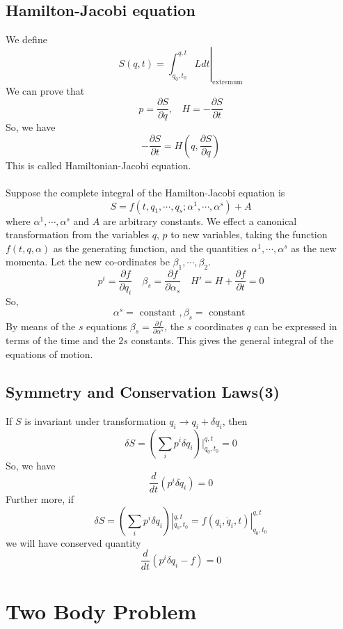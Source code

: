 \section{Hamilton-Jacobi equation}
We define
\[S(q,t)=\left. \int_{q_0,t_0}^{q,t} L dt\right|_{\mathrm{extremum}}\]
We can prove that
\[p = \frac{\partial S}{\partial q}, \ \ \ \ H = -\frac{\partial S}{\partial t}\]
So, we have
\[-\frac{\partial S}{\partial t} = H (q,\frac{\partial S}{\partial q})\]
This is called Hamiltonian-Jacobi equation.\\ \\
Suppose the complete integral of the Hamilton-Jacobi equation is
\[S=f(t,q_1,\cdots,q_s;\alpha^1,\cdots,\alpha^s)+A\]
where $\alpha^1,\cdots,\alpha^s$ and $A$ are arbitrary constants. We effect a canonical transformation from the
variables $q$, $p$ to new variables, taking the function $f(t,q,\alpha)$ as the generating function, and the quantities $\alpha^1,\cdots,\alpha^s$ as the new momenta.
Let the new co-ordinates be $\beta_1,\cdots,\beta_2$.
\[p^i = \frac{\partial f}{\partial q_i} \quad \beta_s = \frac{\partial f}{\partial \alpha_s} \quad H' = H + \frac{\partial f}{\partial t} =0\]
So,
\[\alpha^s = \mbox{ constant }, \beta_s = \mbox{ constant }\]
By means of the $s$ equations $\beta_s = \frac{\partial f}{\partial \alpha^s}$, the $s$ coordinates $q$ can be expressed in terms of the time and the $2s$ constants. This gives the general integral of the equations of motion.

\section{Symmetry and Conservation Laws(3)}
If $S$ is invariant under transformation
$q_i \rightarrow q_i + \delta q_i$, then 
\[\delta S = (\sum_i p^i \delta q_i) |_{q_0,t_0}^{q,t} = 0\]
So, we have
\[\frac{d}{dt} (p^i \delta q_i) = 0\]
Further more, if
\[\delta S = (\sum_i p^i \delta q_i) |_{q_0,t_0}^{q,t} =  f(q_i,\dot{q}_i,t)|_{q_0,t_0}^{q,t}\]
we will have conserved quantity
\[\frac{d}{dt} (p^i \delta q_i -f) = 0\]

\chapter{Two Body Problem}
